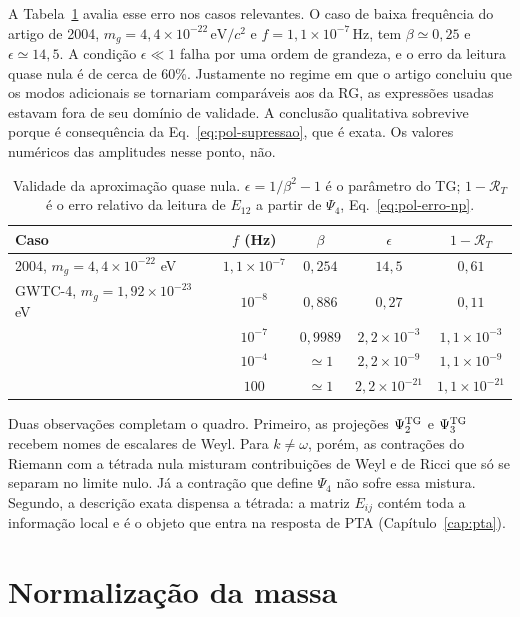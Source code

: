 A Tabela~\ref{tab:pol-validade} avalia esse erro nos casos
relevantes. O caso de baixa frequência do artigo de 2004,
$m_g=4{,}4\times10^{-22}\,\mathrm{eV}/c^2$ e
$f=1{,}1\times10^{-7}\,\mathrm{Hz}$, tem $\beta\simeq0{,}25$ e
$\epsilon\simeq14{,}5$. A condição $\epsilon\ll1$ falha por uma ordem
de grandeza, e o erro da leitura quase nula é de cerca de 60\%.
Justamente no regime em que o artigo concluiu que os modos adicionais
se tornariam comparáveis aos da RG, as expressões usadas estavam fora
de seu domínio de validade. A conclusão qualitativa sobrevive porque é
consequência da Eq.~\eqref{eq:pol-supressao}, que é exata. Os valores
numéricos das amplitudes nesse ponto, não.

\begin{table}[htbp]
\centering
\caption{Validade da aproximação quase nula. $\epsilon=1/\beta^2-1$ é o
parâmetro do TG; $1-\mathcal R_T$ é o erro relativo da leitura de
$E_{12}$ a partir de $\Psi_4$, Eq.~\eqref{eq:pol-erro-np}.}
\label{tab:pol-validade}
\small
\begin{tabular}{lcccc}
\toprule
Caso & $f$ (Hz) & $\beta$ & $\epsilon$ & $1-\mathcal R_T$\\
\midrule
2004, $m_g=4{,}4\times10^{-22}$ eV & $1{,}1\times10^{-7}$ & $0{,}254$ & $14{,}5$ & $0{,}61$\\
GWTC-4, $m_g=1{,}92\times10^{-23}$ eV & $10^{-8}$ & $0{,}886$ & $0{,}27$ & $0{,}11$\\
 & $10^{-7}$ & $0{,}9989$ & $2{,}2\times10^{-3}$ & $1{,}1\times10^{-3}$\\
 & $10^{-4}$ & $\simeq1$ & $2{,}2\times10^{-9}$ & $1{,}1\times10^{-9}$\\
 & $100$ & $\simeq1$ & $2{,}2\times10^{-21}$ & $1{,}1\times10^{-21}$\\
\bottomrule
\end{tabular}
\end{table}

Duas observações completam o quadro. Primeiro, as projeções
$\Psi_2^{\rm TG}$ e $\Psi_3^{\rm TG}$ recebem nomes de escalares de
Weyl. Para $k\neq\omega$, porém, as contrações do Riemann com a tétrada
nula misturam contribuições de Weyl e de Ricci que só se separam no
limite nulo. Já a contração que define $\Psi_4$ não sofre essa mistura.
Segundo, a descrição exata dispensa a tétrada: a matriz $E_{ij}$ contém
toda a informação local e é o objeto que entra na resposta de PTA
(Capítulo~\ref{cap:pta}).

\section{Normalização da massa}
\label{sec:pol-normalizacao}

